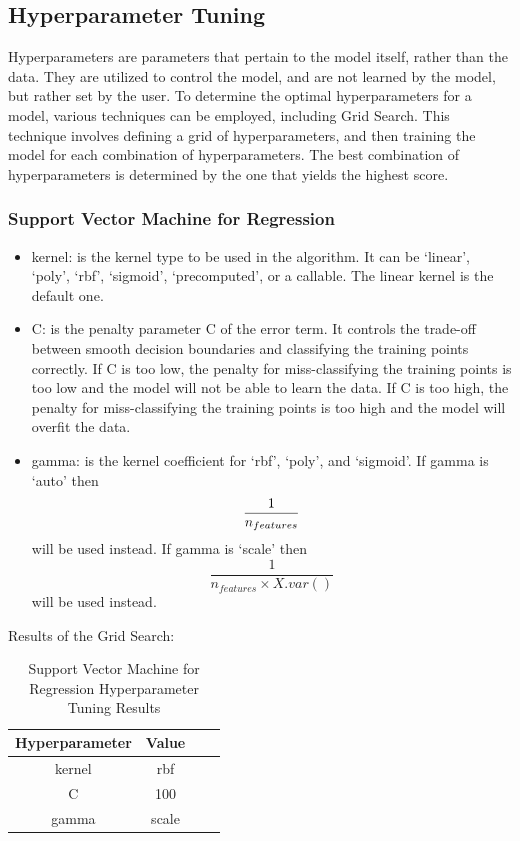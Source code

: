 \documentclass{report}
\begin{document}
\subsection{Hyperparameter Tuning}
Hyperparameters are parameters that pertain to the model itself, rather than the data. They are utilized to control the model, and are not learned by the model, but rather set by the user. To determine the optimal hyperparameters for a model, various techniques can be employed, including Grid Search. This technique involves defining a grid of hyperparameters, and then training the model for each combination of hyperparameters. The best combination of hyperparameters is determined by the one that yields the highest score\cite{scikit-learn}. 
\subsubsection{Support Vector Machine for Regression}
\begin{itemize}
    \item kernel: is the kernel type to be used in the algorithm. It can be ‘linear’, ‘poly’, ‘rbf’, ‘sigmoid’, ‘precomputed’, or a callable. The linear kernel is the default one\cite{scikit-learn}. 
    \item C: is the penalty parameter C of the error term. It controls the trade-off between smooth decision boundaries and classifying the training points correctly. If C is too low, the penalty for miss-classifying the training points is too low and the model will not be able to learn the data. If C is too high, the penalty for miss-classifying the training points is too high and the model will overfit the data\cite{scikit-learn}. 
    \item gamma: is the kernel coefficient for ‘rbf’, ‘poly’, and ‘sigmoid’. If gamma is ‘auto’ then 
    \begin{equation}
    \centering
        \frac{1}{n_{features}}
    \end{equation} 
    will be used instead. If gamma is ‘scale’ then 
    \begin{equation}
        \frac{1}{n_{features} \times X.var()}
    \end{equation} will be used instead\cite{scikit-learn}. 
\end{itemize}
Results of the Grid Search:
\begin{table}[h]
\centering
\begin{tabular}{|c|c|c|c|}
\hline
\textbf{Hyperparameter} & \textbf{Value} \\ \hline
kernel & rbf \\ \hline
C & 100 \\ \hline
gamma & scale \\ \hline
\end{tabular}
\caption{Support Vector Machine for Regression Hyperparameter Tuning Results}
\end{table} \\
\end{document}
